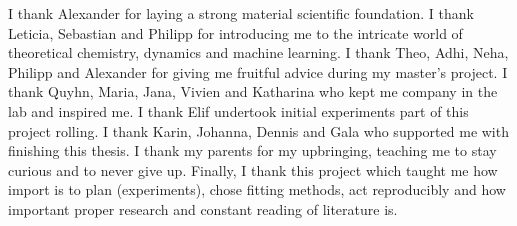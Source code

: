 I thank Alexander for laying a strong material scientific foundation.
I thank Leticia, Sebastian and Philipp for introducing me to the intricate world of theoretical chemistry, dynamics and machine learning. 
I thank Theo, Adhi, Neha, Philipp and Alexander for giving me fruitful advice during my master's project.
I thank Quyhn, Maria, Jana, Vivien and Katharina who kept me company in the lab and inspired me. 
I thank Elif undertook initial experiments part of this project rolling.
I thank Karin, Johanna, Dennis and Gala who supported me with finishing this thesis. 
I thank my parents for my upbringing, teaching me to stay curious and to never give up.
Finally, I thank this project which taught me how import is to plan (experiments), chose fitting methods, act reproducibly and how important proper research and constant reading of literature is. 
